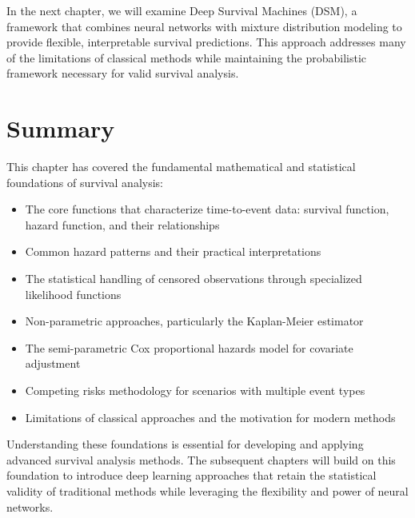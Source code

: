 \begin{notebox}[title=Looking Ahead]
In the next chapter, we will examine Deep Survival Machines (DSM), a framework that combines neural networks with mixture distribution modeling to provide flexible, interpretable survival predictions. This approach addresses many of the limitations of classical methods while maintaining the probabilistic framework necessary for valid survival analysis.
\end{notebox}

\section{Summary}

This chapter has covered the fundamental mathematical and statistical foundations of survival analysis:
\begin{itemize}
    \item The core functions that characterize time-to-event data: survival function, hazard function, and their relationships
    \item Common hazard patterns and their practical interpretations
    \item The statistical handling of censored observations through specialized likelihood functions
    \item Non-parametric approaches, particularly the Kaplan-Meier estimator
    \item The semi-parametric Cox proportional hazards model for covariate adjustment
    \item Competing risks methodology for scenarios with multiple event types
    \item Limitations of classical approaches and the motivation for modern methods
\end{itemize}

Understanding these foundations is essential for developing and applying advanced survival analysis methods. The subsequent chapters will build on this foundation to introduce deep learning approaches that retain the statistical validity of traditional methods while leveraging the flexibility and power of neural networks.